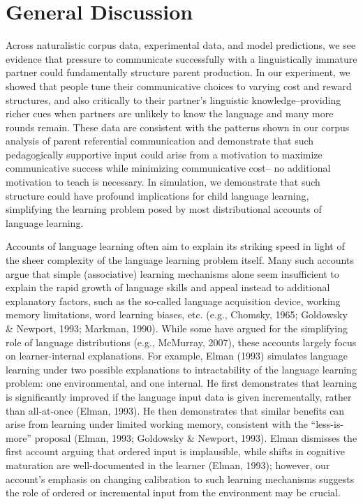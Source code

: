 \documentclass[english,,man,floatsintext]{apa6}
\begin{document}
\hypertarget{general-discussion}{%
\section{General Discussion}\label{general-discussion}}

Across naturalistic corpus data, experimental data, and model predictions, we see evidence that pressure to communicate successfully with a linguistically immature partner could fundamentally structure parent production. In our experiment, we showed that people tune their communicative choices to varying cost and reward structures, and also critically to their partner's linguistic knowledge--providing richer cues when partners are unlikely to know the language and many more rounds remain. These data are consistent with the patterns shown in our corpus analysis of parent referential communication and demonstrate that such pedagogically supportive input could arise from a motivation to maximize communicative success while minimizing communicative cost-- no additional motivation to teach is necessary. In simulation, we demonstrate that such structure could have profound implications for child language learning, simplifying the learning problem posed by most distributional accounts of language learning.

Accounts of language learning often aim to explain its striking speed in light of the sheer complexity of the language learning problem itself. Many such accounts argue that simple (associative) learning mechanisms alone seem insufficient to explain the rapid growth of language skills and appeal instead to additional explanatory factors, such as the so-called language acquisition device, working memory limitations, word learning biases, etc. (e.g., Chomsky, 1965; Goldowsky \& Newport, 1993; Markman, 1990). While some have argued for the simplifying role of language distributions (e.g., McMurray, 2007), these accounts largely focus on learner-internal explanations. For example, Elman (1993) simulates language learning under two possible explanations to intractability of the language learning problem: one environmental, and one internal. He first demonstrates that learning is significantly improved if the language input data is given incrementally, rather than all-at-once (Elman, 1993). He then demonstrates that similar benefits can arise from learning under limited working memory, consistent with the \enquote{less-is-more} proposal (Elman, 1993; Goldowsky \& Newport, 1993). Elman dismisses the first account arguing that ordered input is implausible, while shifts in cognitive maturation are well-documented in the learner (Elman, 1993); however, our account's emphasis on changing calibration to such learning mechanisms suggests the role of ordered or incremental input from the environment may be crucial.
\end{document}
